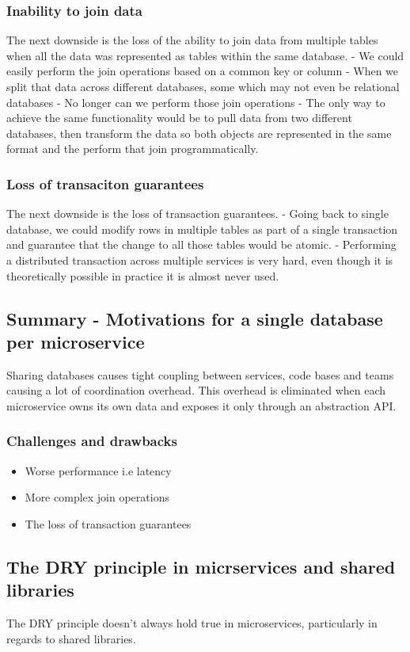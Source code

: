 \subsubsection{Inability to join data}
The next downside is the loss of the ability to join data from multiple tables when all the data was represented as tables within the same database.
- We could easily perform the join operations based on a common key or column
- When we split that data across different databases, some which may not even be relational databases
- No longer can we perform those join operations
- The only way to achieve the same functionality would be to pull data from two different databases, then transform the data so both objects are represented in the same format and the perform that join programmatically.

\subsubsection{Loss of transaciton guarantees}
The next downside is the loss of transaction guarantees.
- Going back to single database, we could modify rows in multiple tables as part of a single transaction and guarantee that the change to all those tables would be atomic.
- Performing a distributed transaction across multiple services is very hard, even though it is theoretically possible in practice it is almost never used.

\subsection{Summary - Motivations for a single database per microservice}
Sharing databases causes tight coupling between services, code bases and teams causing a lot of coordination overhead.
This overhead is eliminated when each microservice owns its own data and exposes it only through an abstraction API.

\subsubsection{Challenges and drawbacks}
\begin{itemize}
    \item Worse performance i.e latency
    \item More complex join operations
    \item The loss of transaction guarantees
\end{itemize}

\subsection{The DRY principle in micrservices and shared libraries}
The DRY principle doesn't always hold true in microservices, particularly in regards to shared libraries.

